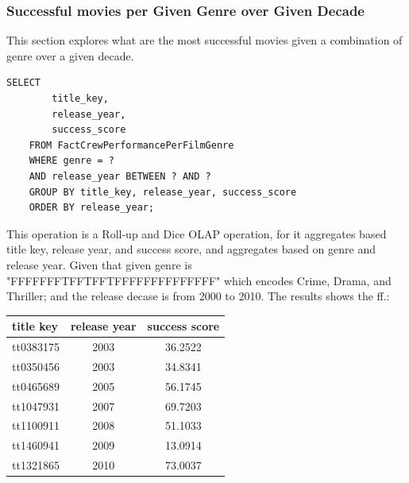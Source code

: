 \subsubsection{Successful movies per Given Genre over Given Decade}

This section explores what are the most successful movies given a combination of genre over a given decade.

\begin{lstlisting}[style=SQLStyle]
	SELECT
		title_key,
		release_year,
		success_score
	FROM FactCrewPerformancePerFilmGenre
	WHERE genre = ?
	AND release_year BETWEEN ? AND ?
	GROUP BY title_key, release_year, success_score
	ORDER BY release_year;
\end{lstlisting}

This operation is a Roll-up and Dice OLAP operation, for it aggregates based title key, release year, and success score, and aggregates based on genre and release year. Given that given genre is "FFFFFFFTFFTFFTFFFFFFFFFFFFFF" which encodes Crime, Drama, and Thriller; and the release decase is from 2000 to 2010. The results shows the ff.:

\begin{center}
\begin{tabular}{|p{4cm}|c|c|}
\hline
title key & release year & success score\\
\hline
tt0383175 & 2003 & 36.2522\\
tt0350456 & 2003 & 34.8341\\
tt0465689 & 2005 & 56.1745\\
tt1047931 & 2007 & 69.7203\\
tt1100911 & 2008 & 51.1033\\
tt1460941 & 2009 & 13.0914\\
tt1321865 & 2010 & 73.0037\\
\hline
\end{tabular}
\end{center}

